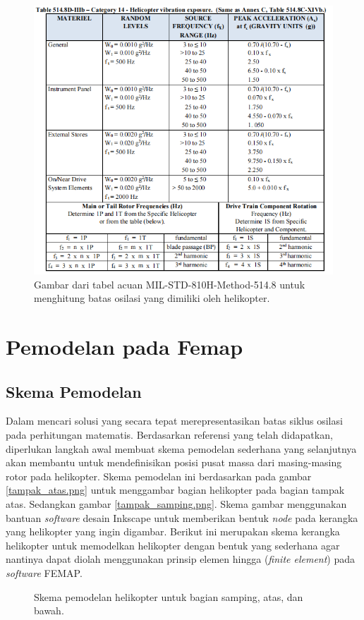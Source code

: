 \begin{figure}[H]
	\centering
	\includegraphics[width=0.8\linewidth]{gambar/MIL_STD.png}
	\caption{Gambar dari tabel acuan MIL-STD-810H-Method-514.8 untuk menghitung batas osilasi yang dimiliki oleh helikopter.}
	\label{fig:MIL_STD}
\end{figure}


\section{Pemodelan pada Femap}
	\label{sec:femap}
\subsection{Skema Pemodelan}
Dalam mencari solusi yang secara tepat merepresentasikan batas siklus osilasi pada perhitungan matematis. Berdasarkan referensi yang telah didapatkan, diperlukan langkah awal membuat skema pemodelan sederhana yang selanjutnya akan membantu untuk mendefinisikan posisi pusat massa dari masing-masing rotor pada helikopter. Skema pemodelan ini berdasarkan pada gambar \ref{tampak_atas.png} untuk menggambar bagian helikopter pada bagian tampak atas. Sedangkan gambar \ref{tampak_samping.png}. Skema gambar menggunakan bantuan \textit{software} desain Inkscape untuk memberikan bentuk \textit{node} pada kerangka yang helikopter yang ingin digambar. Berikut ini merupakan skema kerangka helikopter untuk memodelkan helikopter dengan bentuk yang sederhana agar nantinya dapat diolah menggunakan prinsip elemen hingga (\textit{finite element}) pada \textit{software} FEMAP.

\begin{figure}[H]
	\centering
	\caption{Skema pemodelan helikopter untuk bagian samping, atas, dan bawah.}
	\label{fig:skema_model}
\end{figure}

